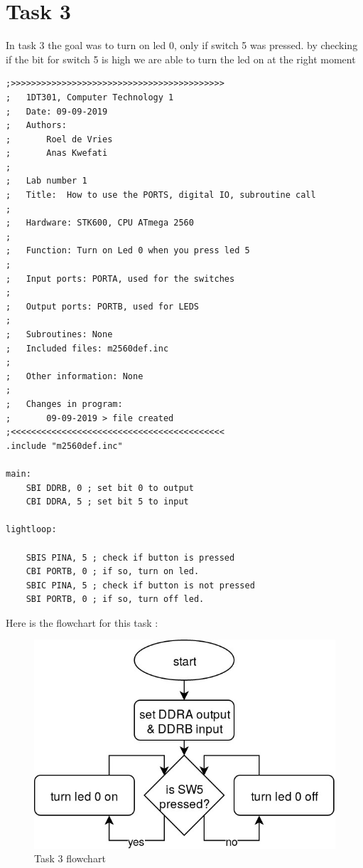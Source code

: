 \documentclass[a4paper,12pt]{article}
\begin{document}
\break

\section{Task 3}
In task 3 the goal was to turn on led 0, only if switch 5 was pressed. by checking if the bit for switch 5 is high we are able to turn the led on at the right moment

\lstset{style=Asm}

\begin{lstlisting}
;>>>>>>>>>>>>>>>>>>>>>>>>>>>>>>>>>>>>>>>>>>
;	1DT301, Computer Technology 1
;	Date: 09-09-2019
;	Authors:
;		Roel de Vries
;		Anas Kwefati
;
;	Lab number 1
;	Title:	How to use the PORTS, digital IO, subroutine call
;
;	Hardware: STK600, CPU ATmega 2560
;
;	Function: Turn on Led 0 when you press led 5
;
;	Input ports: PORTA, used for the switches
;
;	Output ports: PORTB, used for LEDS
;
;	Subroutines: None
;	Included files: m2560def.inc
;
;	Other information: None
;
;	Changes in program: 
;		09-09-2019 > file created
;<<<<<<<<<<<<<<<<<<<<<<<<<<<<<<<<<<<<<<<<<<
.include "m2560def.inc"

main:
	SBI DDRB, 0 ; set bit 0 to output
	CBI DDRA, 5 ; set bit 5 to input

lightloop:

	SBIS PINA, 5 ; check if button is pressed
	CBI PORTB, 0 ; if so, turn on led.
	SBIC PINA, 5 ; check if button is not pressed
	SBI PORTB, 0 ; if so, turn off led.
\end{lstlisting}

Here is the flowchart for this task : 
\begin{figure}
\begin{center}
\includegraphics[width=\textwidth/2 ]{flowchart/task3_flowchart.jpg}
\end{center}
\caption{Task 3 flowchart}
\label{task3}
\end{figure}
\end{document}
